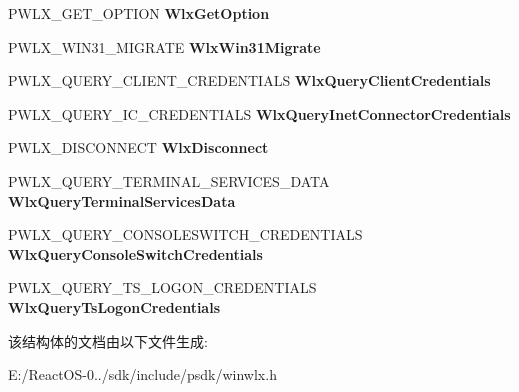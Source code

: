 \begin{DoxyCompactItemize}
P\+W\+L\+X\+\_\+\+G\+E\+T\+\_\+\+O\+P\+T\+I\+ON {\bfseries Wlx\+Get\+Option}
\item 
\mbox{\label{struct___w_l_x___d_i_s_p_a_t_c_h___v_e_r_s_i_o_n__1__4_a48fa44fac8a2826d6016ca01a7d07398}} 
P\+W\+L\+X\+\_\+\+W\+I\+N31\+\_\+\+M\+I\+G\+R\+A\+TE {\bfseries Wlx\+Win31\+Migrate}
\item 
\mbox{\label{struct___w_l_x___d_i_s_p_a_t_c_h___v_e_r_s_i_o_n__1__4_aec63fee6c9ed7a289b9446951b4aacb0}} 
P\+W\+L\+X\+\_\+\+Q\+U\+E\+R\+Y\+\_\+\+C\+L\+I\+E\+N\+T\+\_\+\+C\+R\+E\+D\+E\+N\+T\+I\+A\+LS {\bfseries Wlx\+Query\+Client\+Credentials}
\item 
\mbox{\label{struct___w_l_x___d_i_s_p_a_t_c_h___v_e_r_s_i_o_n__1__4_a1e88139d278af172d6bfe52f3e0c9b0d}} 
P\+W\+L\+X\+\_\+\+Q\+U\+E\+R\+Y\+\_\+\+I\+C\+\_\+\+C\+R\+E\+D\+E\+N\+T\+I\+A\+LS {\bfseries Wlx\+Query\+Inet\+Connector\+Credentials}
\item 
\mbox{\label{struct___w_l_x___d_i_s_p_a_t_c_h___v_e_r_s_i_o_n__1__4_a03db4c4cb80d5f86dbe8524c7c001e33}} 
P\+W\+L\+X\+\_\+\+D\+I\+S\+C\+O\+N\+N\+E\+CT {\bfseries Wlx\+Disconnect}
\item 
\mbox{\label{struct___w_l_x___d_i_s_p_a_t_c_h___v_e_r_s_i_o_n__1__4_a99c50ce2fc4e1568e31dd63f20f53f1a}} 
P\+W\+L\+X\+\_\+\+Q\+U\+E\+R\+Y\+\_\+\+T\+E\+R\+M\+I\+N\+A\+L\+\_\+\+S\+E\+R\+V\+I\+C\+E\+S\+\_\+\+D\+A\+TA {\bfseries Wlx\+Query\+Terminal\+Services\+Data}
\item 
\mbox{\label{struct___w_l_x___d_i_s_p_a_t_c_h___v_e_r_s_i_o_n__1__4_ad8ca0d9777fbc16c36e6020abd9b327f}} 
P\+W\+L\+X\+\_\+\+Q\+U\+E\+R\+Y\+\_\+\+C\+O\+N\+S\+O\+L\+E\+S\+W\+I\+T\+C\+H\+\_\+\+C\+R\+E\+D\+E\+N\+T\+I\+A\+LS {\bfseries Wlx\+Query\+Console\+Switch\+Credentials}
\item 
\mbox{\label{struct___w_l_x___d_i_s_p_a_t_c_h___v_e_r_s_i_o_n__1__4_a9d57a0d4b1192dce376b1e9222a62786}} 
P\+W\+L\+X\+\_\+\+Q\+U\+E\+R\+Y\+\_\+\+T\+S\+\_\+\+L\+O\+G\+O\+N\+\_\+\+C\+R\+E\+D\+E\+N\+T\+I\+A\+LS {\bfseries Wlx\+Query\+Ts\+Logon\+Credentials}
\end{DoxyCompactItemize}


该结构体的文档由以下文件生成\+:\begin{DoxyCompactItemize}
\item 
E\+:/\+React\+O\+S-\/0../sdk/include/psdk/winwlx.\+h\end{DoxyCompactItemize}
